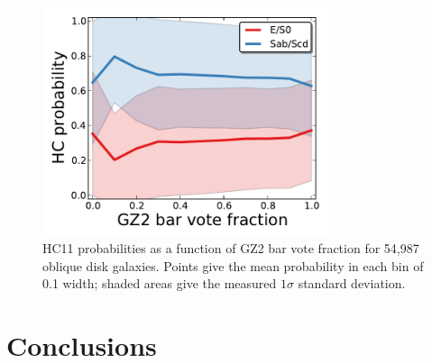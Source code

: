 \documentclass[useAMS,usenatbib]{mn2e}
\begin{document}
\begin{figure}
\includegraphics[angle=0,width=3.3in]{figures/hc_gz2_bar.pdf}
\caption{HC11 probabilities as a function of GZ2 bar vote fraction for 54,987 oblique disk galaxies. Points give the mean probability in each bin of 0.1 width; shaded areas give the measured $1\sigma$ standard deviation. 
\label{fig-hc_gz2_bar}}
\end{figure}

%


%


\section{Conclusions}\label{sec-conclusion}
\end{document}
